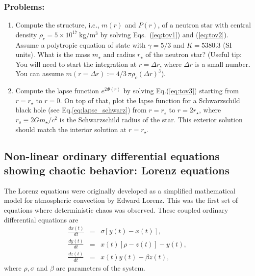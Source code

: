 \subsubsection*{Problems:}
\begin{enumerate}
\item Compute the structure, i.e., $m(r)$ and $P(r)$,  of a neutron star with central density $\rho_c = 5 \times 10^{17} ~ \mathrm{kg/m^{3}}$ by solving Eqs.~(\ref{eq:tov1}) and (\ref{eq:tov2}). Assume a polytropic equation of state with $\gamma = 5/3$ and $K = 5380.3$ (SI units). What is the mass $m_\star$ and radius $r_\star$ of the neutron star?  (Useful tip: You will need to start the integration at $r = \Delta r$, where $\Delta r$ is a small number. You can assume $m(r = \Delta r) := 4/3 \, \pi \rho_c  (\Delta r)^3$).
\item Compute the lapse function $e^{2\Phi(r)}$ by solving Eq.(\ref{eq:tov3}) starting from $r = r_\star$ to $r = 0$. On top of that, plot the lapse function for a Schwarzschild black hole (see Eq.\ref{eq:lapse_schwarz}) from $r = r_s$ to $r = 2 r_\star$, where $r_s \equiv 2 G m_\star/c^2$ is the Schwarzschild radius of the star. This exterior solution should match the interior solution at $r = r_\star$.  
\end{enumerate}

\subsection{Non-linear ordinary differential equations showing chaotic behavior: Lorenz equations}
 The Lorenz equations were originally developed as a simplified mathematical model for atmospheric convection by Edward Lorenz. This was the first set of equations where deterministic chaos was observed. These coupled ordinary differential equations are 
 \begin{eqnarray}
 	\frac{dx(t)}{dt} & = & \sigma [y(t)-x(t)], \nonumber \\
 	\frac{dy(t)}{dt} & = & x(t) [\rho - z(t)] - y(t), \nonumber \\
 	\frac{dz(t)}{dt} & = & x(t)y(t) - \beta z(t),
 \end{eqnarray}
 where $\rho, \sigma$ and $\beta$ are parameters of the system. 
